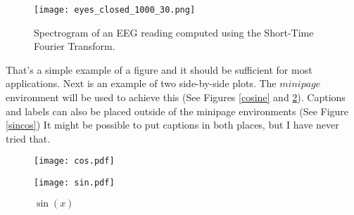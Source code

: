 \documentclass[11pt,letterpaper]{article}
\begin{document}
\begin{figure}
    \centering %
    \texttt{[image: eyes\_closed\_1000\_30.png]}
    \caption{Spectrogram of an EEG reading computed using the Short-Time Fourier
        Transform.}
    \label{bsc}
\end{figure}

That's a simple example of a figure and it should be sufficient for most
applications. Next is an example of two side-by-side plots. The $minipage$
environment will be used to achieve this (See Figures \ref{cosine} and
\ref{sine}). Captions and labels can also be placed outside of the minipage
environments (See Figure \ref{sincos}) It might be possible to put captions in
both places, but I have never tried that.\\

\begin{figure}
    \centering %
    \begin{minipage}[t]{0.45\textwidth}
        \centering %
        \texttt{[image: cos.pdf]}
        \caption{$\cos(x)$}
        \label{cosine}
    \end{minipage}
    \hspace{0.5cm}
    \begin{minipage}[t]{0.45\textwidth}
        \centering
        \texttt{[image: sin.pdf]}
        \caption{$\sin(x)$}
        \label{sine}
    \end{minipage}
\end{figure}
\end{document}
